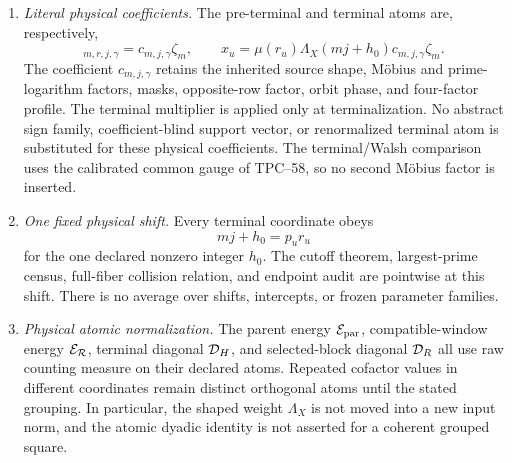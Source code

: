 \begin{enumerate}[label=\textup{(A\arabic*)},leftmargin=3.2em]
 \item \emph{Literal physical coefficients.}
       The pre-terminal and terminal atoms are, respectively,
       \begin{equation}
        [G_X^L]_{m,r,j,\gamma}=c_{m,j,\gamma}\zeta_m,
        \qquad
        x_u=\mu(r_u)\Lambda_X(mj+h_0)c_{m,j,\gamma}\zeta_m.
        \label{eq:tpc59-audit-literal-coefficients}
       \end{equation}
       The coefficient \(c_{m,j,\gamma}\) retains the inherited source
       shape, M\"obius and prime-logarithm factors, masks, opposite-row
       factor, orbit phase, and four-factor profile.  The terminal multiplier
       is applied only at terminalization.  No abstract sign family,
       coefficient-blind support vector, or renormalized terminal atom is
       substituted for these physical coefficients.  The terminal/Walsh
       comparison uses the calibrated common gauge of TPC--58, so no second
       M\"obius factor is inserted.

 \item \emph{One fixed physical shift.}
       Every terminal coordinate obeys
       \begin{equation}
        mj+h_0=p_ur_u
        \label{eq:tpc59-audit-fixed-shift}
       \end{equation}
       for the one declared nonzero integer \(h_0\).  The cutoff theorem,
       largest-prime census, full-fiber collision relation, and endpoint
       audit are pointwise at this shift.  There is no average over shifts,
       intercepts, or frozen parameter families.

 \item \emph{Physical atomic normalization.}
       The parent energy \(\mathcal E_{\rm par}\), compatible-window energy
       \(\mathcal E_{\mathcal R}\), terminal diagonal \(\mathcal D_H\), and selected-block
       diagonal \(\mathcal D_R\) all use raw counting measure on their declared
       atoms.  Repeated cofactor values in different coordinates remain
       distinct orthogonal atoms until the stated grouping.  In particular,
       the shaped weight \(\Lambda_X\) is not moved into a new input norm,
       and the atomic dyadic identity is not asserted for a coherent grouped
       square.


\end{enumerate}
